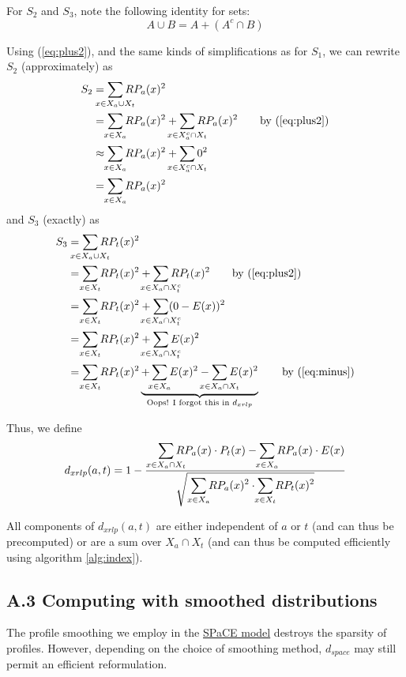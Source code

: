 \documentclass[twocolumn,10pt]{article}
\begin{document}
For $S_2$ and $S_3$, note the following identity for sets:
\begin{equation}
\label{eq:plus2}
A \cup B = A + (A^c \cap B)
\end{equation}

Using (\ref{eq:plus2}), and the same kinds of simplifications
as for $S_1$, we can rewrite $S_2$ (approximately) as
\begin{align*}
S_2
&=
    \smashoperator{\sum_{x \in X_a \cup X_t}} RP_a(x)^2
\\
&=
    \smashoperator{\sum_{x \in X_a}} RP_a(x)^2
    + \smashoperator{\sum_{x \in X_a^c \cap X_t}} RP_a(x)^2
\tag*{by (\ref{eq:plus2})}
\\
&\approx
    \smashoperator{\sum_{x \in X_a}} RP_a(x)^2
    + \smashoperator{\sum_{x \in X_a^c \cap X_t}} 0^2
\\
&= 
    \smashoperator{\sum_{x \in X_a}} RP_a(x)^2
\end{align*}
and $S_3$ (exactly) as 
\begin{align*}
S_3
&=
    \smashoperator{\sum_{x \in X_a \cup X_t}} RP_t(x)^2
\\
&=
    \smashoperator{\sum_{x \in X_t}} RP_t(x)^2
    + \smashoperator{\sum_{x \in X_a \cap X_t^c}} RP_t(x)^2
\tag*{by (\ref{eq:plus2})}
\\
&=
    \smashoperator{\sum_{x \in X_t}} RP_t(x)^2
    + \smashoperator{\sum_{x \in X_a \cap X_t^c}} (0 - E(x))^2
\\
&=
    \smashoperator{\sum_{x \in X_t}} RP_t(x)^2
    + \smashoperator{\sum_{x \in X_a \cap X_t^c}} E(x)^2
\\
&=
    \smashoperator{\sum_{x \in X_t}} RP_t(x)^2
    \underbrace{
    + \smashoperator{\sum_{x \in X_a}} E(x)^2
    - \smashoperator{\sum_{x \in X_a \cap X_t}} E(x)^2
    }_{\text{Oops! I forgot this in $d_{xrlp}$}}
\tag*{by (\ref{eq:minus})}
\end{align*}

Thus, we define
$$
d_{xrlp}(a, t)
= 1 -
\frac{\displaystyle
    \smashoperator[r]{\sum_{x \in X_a \cap X_t}}
        RP_a(x) \cdot P_t(x)
    - \smashoperator{\sum_{x \in X_a}}
        RP_a(x) \cdot E(x)
}{\displaystyle
    \sqrt{\smashoperator[r]{\sum_{x \in X_a}} RP_a(x)^2
    \cdot \smashoperator{\sum_{x \in X_t}} RP_t(x)^2}
}
$$

All components of $d_{xrlp}(a, t)$ are either independent of
$a$ or $t$ (and can thus be precomputed) or are a sum over
$X_a \cap X_t$ (and can thus be computed efficiently using
algorithm \ref{alg:index}).



\subsection*{A.3 Computing with smoothed distributions}

The profile smoothing we employ in the \hyperlink{par:space}{SPaCE
model} destroys the sparsity of profiles. However, depending on the
choice of smoothing method, $d_{space}$ may still permit an efficient
reformulation.
\end{document}
